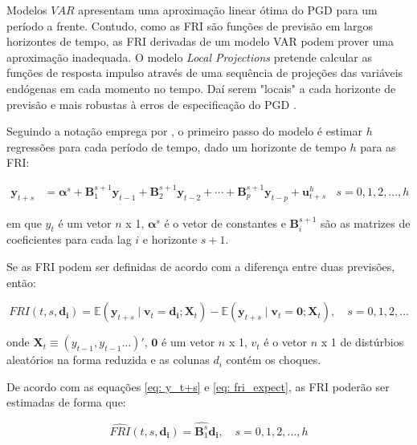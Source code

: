 Modelos \(VAR\) apresentam uma aproximação linear ótima do PGD para um período a frente. Contudo, como as FRI são funções de previsão em largos horizontes de tempo, as FRI derivadas de um modelo VAR podem prover uma aproximação inadequada. O modelo \textit{Local Projections} pretende calcular as funções de resposta impulso através de uma sequência de projeções das variáveis endógenas em cada momento no tempo. Daí serem "locais" a cada horizonte de previsão e mais robustas à erros de especificação do PGD \parencite{jorda_estimation_2005}. 

Seguindo a notação emprega por \textcite{jorda_estimation_2005}, o primeiro passo do modelo é estimar \(h\) regressões para cada período de tempo, dado um horizonte de tempo \(h\) para as FRI:

\begin{equation}
\label{eq: y_t+s}
\begin{aligned}
    \mathbf{y}_{t+s} &= \boldsymbol{\alpha}^s + \mathbf{B}_1^{s+1} \mathbf{y}_{t-1} + \mathbf{B}_2^{s+1} \mathbf{y}_{t-2} + \cdots + \mathbf{B}_p^{s+1} \mathbf{y}_{t-p} + \mathbf{u}_{t+s}^h ~~~~ s = 0, 1, 2, ...,  h
\end{aligned}
\end{equation}

em que \(y_t\) é um vetor \(n\) x 1, \(\boldsymbol{\alpha}^s\) é o vetor de constantes e \(\mathbf{B}_i^{s+1}\) são as matrizes de coeficientes para cada lag \(i\) e horizonte \(s+1\).

Se as FRI podem ser definidas de acordo com a diferença entre duas previsões, então:

\begin{equation}
\label{eq: fri_expect}
    \mathit{FRI}(t, s, \mathbf{d_i}) = \mathbb{E}(\mathbf{y}_{t+s} \mid \mathbf{v}_t = \mathbf{d_i}; \mathbf{X}_t) - \mathbb{E}(\mathbf{y}_{t+s} \mid \mathbf{v}_t = \mathbf{0}; \mathbf{X}_t), \quad s = 0, 1, 2, \ldots
\end{equation}

onde \(\mathbf{X}_t \equiv (y_{t-1}, y_{t-1}...)'\), \(\mathbf{0}\) é um vetor \(n\)  x 1, \(v_t\) é o vetor \(n\) x 1 de distúrbios aleatórios na forma reduzida e as colunas \(d_i\) contém os choques.   

De acordo com as equações \ref{eq: y_t+s} e \ref{eq: fri_expect}, as FRI poderão ser estimadas de forma que:


\begin{equation}
    \hat{FRI}(t, s, \mathbf{d_i}) = \hat{\mathbf{B}_1^s} \mathbf{d_i}, \quad s = 0, 1, 2, \ldots, h
\end{equation}

